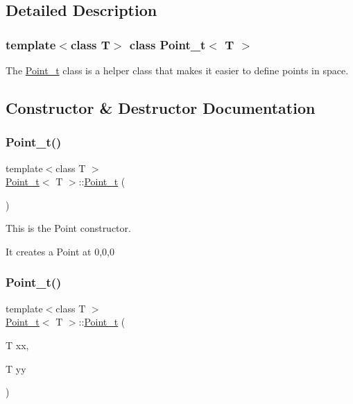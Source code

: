\subsection{Detailed Description}
\subsubsection*{template$<$class T$>$\newline
class Point\+\_\+t$<$ T $>$}

The \hyperlink{class_point__t}{Point\+\_\+t} class is a helper class that makes it easier to define points in space. 

\subsection{Constructor \& Destructor Documentation}
\mbox{\label{class_point__t_a6a0871ca8592da56fae8dd0fde4dcc5d}} 
\subsubsection{\texorpdfstring{Point\+\_\+t()}{Point\_t()}\hspace{0.1cm}{\footnotesize\ttfamily [1/3]}}
{\footnotesize\ttfamily template$<$class T $>$ \\
\hyperlink{class_point__t}{Point\+\_\+t}$<$ T $>$\+::\hyperlink{class_point__t}{Point\+\_\+t} (\begin{DoxyParamCaption}{ }\end{DoxyParamCaption})}



This is the Point constructor. 

It creates a Point at 0,0,0 \mbox{\label{class_point__t_a74da469bad09c76462acae8e1b5f1a28}} 
\subsubsection{\texorpdfstring{Point\+\_\+t()}{Point\_t()}\hspace{0.1cm}{\footnotesize\ttfamily [2/3]}}
{\footnotesize\ttfamily template$<$class T $>$ \\
\hyperlink{class_point__t}{Point\+\_\+t}$<$ T $>$\+::\hyperlink{class_point__t}{Point\+\_\+t} (\begin{DoxyParamCaption}\item[{T}]{xx,  }\item[{T}]{yy }\end{DoxyParamCaption})}



